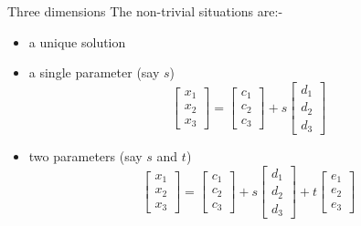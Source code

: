 \documentclass{beamer}
\begin{document}
\begin{frame}{Three dimensions}
  The non-trivial situations are:-
  \begin{itemize}
  \item a unique solution
  \item a single parameter (say $s$)
    \begin{equation*}
      \left[
	\begin{array}{c}
          x_1\\
          x_2\\
          x_3
	\end{array}
      \right]= \left[
	\begin{array}{c}
          c_1\\
          c_2\\
          c_3
	\end{array}
      \right]+s \left[
	\begin{array}{c}
          d_1\\
          d_2\\
          d_3
	\end{array}
      \right]
    \end{equation*}
     \item two parameters (say $s$ and $t$)
    \begin{equation*}
      \left[
	\begin{array}{c}
          x_1\\
          x_2\\
          x_3
	\end{array}
      \right]= \left[
	\begin{array}{c}
          c_1\\
          c_2\\
          c_3
	\end{array}
      \right]+s \left[
	\begin{array}{c}
          d_1\\
          d_2\\
          d_3
	\end{array}
      \right]+ t \left[
	\begin{array}{c}
          e_1\\
          e_2\\
          e_3
	\end{array}
      \right]
    \end{equation*}
  \end{itemize}
\end{frame}
\end{document}

